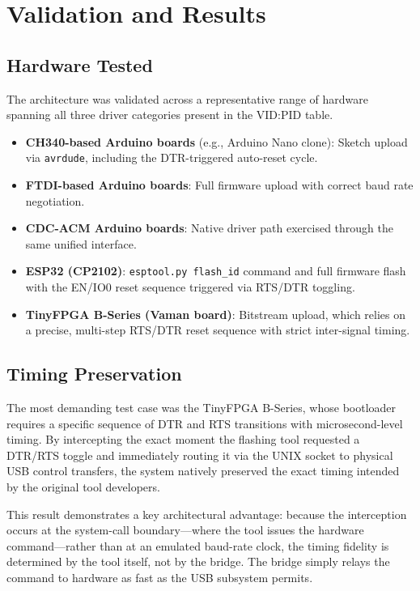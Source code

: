 \documentclass[conference]{IEEEtran}
\begin{document}
\section{Validation and Results}
\label{sec:results}

\subsection{Hardware Tested}

The architecture was validated across a representative range of hardware spanning all three driver categories present in the VID:PID table.

\begin{itemize}
  \item \textbf{CH340-based Arduino boards} (e.g., Arduino Nano clone): Sketch upload via \texttt{avrdude}, including the DTR-triggered auto-reset cycle.
  \item \textbf{FTDI-based Arduino boards}: Full firmware upload with correct baud rate negotiation.
  \item \textbf{CDC-ACM Arduino boards}: Native driver path exercised through the same unified interface.
  \item \textbf{ESP32 (CP2102)}: \texttt{esptool.py flash\_id} command and full firmware flash with the EN/IO0 reset sequence triggered via RTS/DTR toggling.
  \item \textbf{TinyFPGA B-Series (Vaman board)}: Bitstream upload, which relies on a precise, multi-step RTS/DTR reset sequence with strict inter-signal timing.
\end{itemize}

\subsection{Timing Preservation}

The most demanding test case was the TinyFPGA B-Series, whose bootloader requires a specific sequence of DTR and RTS transitions with microsecond-level timing. By intercepting the exact moment the flashing tool requested a DTR/RTS toggle and immediately routing it via the UNIX socket to physical USB control transfers, the system natively preserved the exact timing intended by the original tool developers.

This result demonstrates a key architectural advantage: because the interception occurs at the system-call boundary—where the tool issues the hardware command—rather than at an emulated baud-rate clock, the timing fidelity is determined by the tool itself, not by the bridge. The bridge simply relays the command to hardware as fast as the USB subsystem permits.
\end{document}
